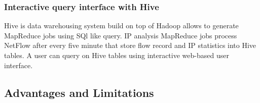       \subsubsection{Interactive query interface with Hive}
      Hive is data warehousing system build on top of Hadoop allows to generate MapReduce jobs using SQl like query.
      IP analysis MapReduce jobs process NetFlow after every five minute that store flow record and IP statistics into
      Hive tables. A user can query on Hive tables using interactive web-based user interface.
      
      \subsection{Advantages and Limitations}
